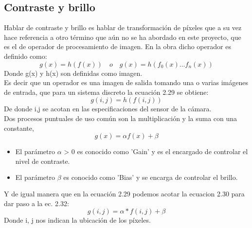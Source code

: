 
\subsection{Contraste y brillo}
Hablar de contraste y brillo es hablar de transformación de píxeles que a su vez hace referencia a otro término que aún
no se ha abordado en este proyecto, que es el de operador de procesamiento de imagen. En la obra \cite{Book:Richard2011}
dicho operador es definido como:
\begin{equation}
	g(x) = h(f(x)) \quad o \quad g(x) = h(f_0(x) \dots f_n(x))
\end{equation}
Donde g(x) y h(x) son definidas como imagen.\\
Es decir que un operador es una imagen de salida tomando una o varias imágenes de entrada, que para un sistema discreto
la ecuación 2.29 se obtiene:
\begin{equation}
	g(i,j) = h(f(i,j))
\end{equation}
De donde i,j se acotan en las especificaciones del sensor de la cámara. \\Dos procesos puntuales de uso común
son la multiplicación y la suma con una constante,
\begin{equation}
	g(x) = \alpha f(x) + \beta
\end{equation}
\begin{itemize}
	\item El parámetro $\alpha$ > 0 es conocido como 'Gain' y es el encargado de controlar el nivel de contraste.
	\item El parámetro $\beta$ es conocido como 'Bias' y se encarga de controlar el brillo.
\end{itemize}
Y de igual manera que en la ecuación 2.29 podemos acotar la ecuacion 2.30 para dar paso a la ec. 2.32:
\begin{equation}
	g(i,j) = \alpha * f(i,j) + \beta
\end{equation}
Donde i, j nos indican la ubicación de los píxeles.

